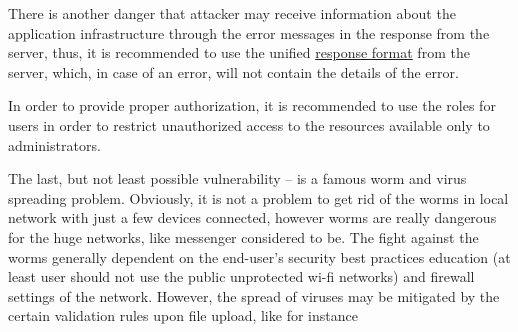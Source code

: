 There is another danger that attacker may receive information about the application infrastructure through the error messages in the
response from the server, thus, it is recommended to use the unified \href{https://datatracker.ietf.org/doc/html/rfc7231}{response format}
from the server, which, in case of an error, will not contain the details of the error.

In order to provide proper authorization, it is recommended to use the roles for users in order to restrict
unauthorized access to the resources available only to administrators.

The last, but not least possible vulnerability -- is a famous worm and virus spreading problem.
Obviously, it is not a problem to get rid of the worms in local network with just a few devices connected,
however worms are really dangerous for the huge networks, like messenger considered to be.
The fight against the worms generally dependent on the end-user's security best practices education (at least user should
not use the public unprotected wi-fi networks) and firewall settings of the network.
However, the spread of viruses may be mitigated by the certain validation rules upon file upload, like for instance
